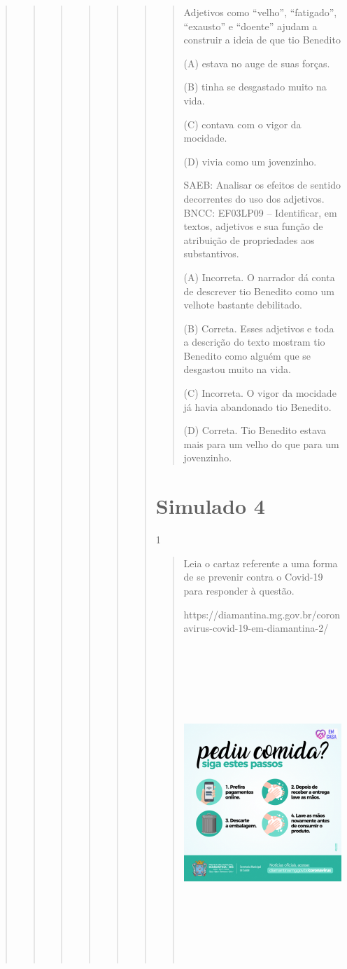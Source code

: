 \begin{boxlist}
{{\begin{quote}
\begin{quote}
\begin{quote}
{\begin{quote}
{\begin{quote}
\begin{quote}
\begin{quote}
Adjetivos como ``velho'', ``fatigado'', ``exausto'' e ``doente'' ajudam a construir a ideia de que tio Benedito

(A) estava no auge de suas forças.

(B) tinha se desgastado muito na vida.

(C) contava com o vigor da mocidade.

(D) vivia como um jovenzinho.

SAEB: Analisar os efeitos de sentido decorrentes do uso dos adjetivos.
BNCC: EF03LP09 -- Identificar, em textos, adjetivos e sua função de atribuição de propriedades
aos substantivos.

(A) Incorreta. O narrador dá conta de descrever tio Benedito como um velhote bastante debilitado.

(B) Correta. Esses adjetivos e toda a descrição do texto mostram tio Benedito como alguém que se desgastou muito na vida.

(C) Incorreta. O vigor da mocidade já havia abandonado tio Benedito.

(D) Correta. Tio Benedito estava mais para um velho do que para um jovenzinho.
\end{quote}

\chapter{Simulado 4}

\num{1}

\begin{quote}
Leia o cartaz referente a uma forma de se prevenir contra o Covid-19
para responder à questão.

https://diamantina.mg.gov.br/coronavirus-covid-19-em-diamantina-2/

\includegraphics[width=4.68750in,height=4.68750in]{media/image36.png}


\end{quote}
\end{quote}
\end{quote}}
\end{quote}}
\end{quote}
\end{quote}
\end{quote}}}
\end{boxlist}
